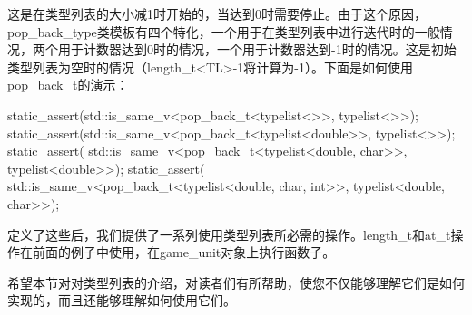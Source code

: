 这是在类型列表的大小减1时开始的，当达到0时需要停止。由于这个原因，pop_back_type类模板有四个特化，一个用于在类型列表中进行迭代时的一般情况，两个用于计数器达到0时的情况，一个用于计数器达到-1时的情况。这是初始类型列表为空时的情况（length_t<TL>-1将计算为-1）。下面是如何使用pop_back_t的演示：

\begin{cppcode}
static_assert(std::is_same_v<pop_back_t<typelist<>>,
							 typelist<>>);
static_assert(std::is_same_v<pop_back_t<typelist<double>>,
							 typelist<>>);
static_assert(
	std::is_same_v<pop_back_t<typelist<double, char>>,
							  typelist<double>>);
static_assert(
	std::is_same_v<pop_back_t<typelist<double, char, int>>,
							  typelist<double, char>>);
\end{cppcode}

定义了这些后，我们提供了一系列使用类型列表所必需的操作。length_t和at_t操作在前面的例子中使用，在game_unit对象上执行函数子。

希望本节对对类型列表的介绍，对读者们有所帮助，使您不仅能够理解它们是如何实现的，而且还能够理解如何使用它们。



















